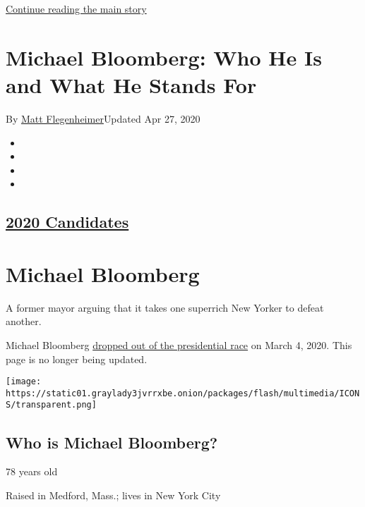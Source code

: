 \protect\hyperlink{after-top}{Continue reading the main story}

\hypertarget{michael-bloomberg-who-he-is-and-what-he-stands-for}{%
\section{Michael Bloomberg: Who He Is and What He Stands
For}\label{michael-bloomberg-who-he-is-and-what-he-stands-for}}

By \href{https://www.nytimes3xbfgragh.onion/by/matt-flegenheimer}{Matt
Flegenheimer}Updated Apr 27, 2020

\begin{itemize}
\item
\item
\item
\item
\end{itemize}

\hypertarget{2020-candidates-}{%
\subsection{\texorpdfstring{\href{https://www.nytimes3xbfgragh.onion/interactive/2019/us/politics/2020-presidential-candidates.html}{2020
Candidates} }{2020 Candidates }}\label{2020-candidates-}}

\hypertarget{michael-bloomberg}{%
\section{Michael Bloomberg}\label{michael-bloomberg}}

A former mayor arguing that it takes one superrich New Yorker to defeat
another.

Michael Bloomberg
\href{https://www.nytimes3xbfgragh.onion/2020/03/04/us/politics/michael-bloomberg-drops-out.html}{dropped
out of the presidential race} on March 4, 2020. This page is no longer
being updated.

\texttt{[image: https://static01.graylady3jvrrxbe.onion/packages/flash/multimedia/ICONS/transparent.png]}

\hypertarget{who-is-michael-bloomberg}{%
\subsection{Who is Michael Bloomberg?}\label{who-is-michael-bloomberg}}

78 years old

Raised in Medford, Mass.; lives in New York City


